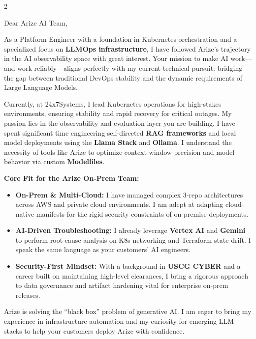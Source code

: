 \documentclass[10pt, a4paper]{article}
\begin{document}
\begin{paracol}{2}
\begin{rightcolumn}
\begin{minipage}{0.85\linewidth}
        \noindent Dear Arize AI Team,

        \medskip

        \noindent As a Platform Engineer with a foundation in Kubernetes orchestration and a specialized focus on \textbf{LLMOps infrastructure}, I have followed Arize’s trajectory in the AI observability space with great interest. Your mission to make AI work---and work reliably---aligns perfectly with my current technical pursuit: bridging the gap between traditional DevOps stability and the dynamic requirements of Large Language Models.

        \medskip

        \noindent Currently, at 24x7Systems, I lead Kubernetes operations for high-stakes environments, ensuring stability and rapid recovery for critical outages. My passion lies in the observability and evaluation layer you are building. I have spent significant time engineering self-directed \textbf{RAG frameworks} and local model deployments using the \textbf{Llama Stack} and \textbf{Ollama}. I understand the necessity of tools like Arize to optimize context-window precision and model behavior via custom \textbf{Modelfiles}.

        \medskip

        \noindent \textbf{Core Fit for the Arize On-Prem Team:}

        \begin{itemize}
            \item \textbf{On-Prem \& Multi-Cloud:} I have managed complex 3-repo architectures across AWS and private cloud environments. I am adept at adapting cloud-native manifests for the rigid security constraints of on-premise deployments.
            \item \textbf{AI-Driven Troubleshooting:} I already leverage \textbf{Vertex AI} and \textbf{Gemini} to perform root-cause analysis on K8s networking and Terraform state drift. I speak the same language as your customers' AI engineers.
            \item \textbf{Security-First Mindset:} With a background in \textbf{USCG CYBER} and a career built on maintaining high-level clearances, I bring a rigorous approach to data governance and artifact hardening vital for enterprise on-prem releases.
        \end{itemize}

        \medskip

        \noindent Arize is solving the ``black box'' problem of generative AI. I am eager to bring my experience in infrastructure automation and my curiosity for emerging LLM stacks to help your customers deploy Arize with confidence.


\end{minipage}
\end{rightcolumn}
\end{paracol}
\end{document}
